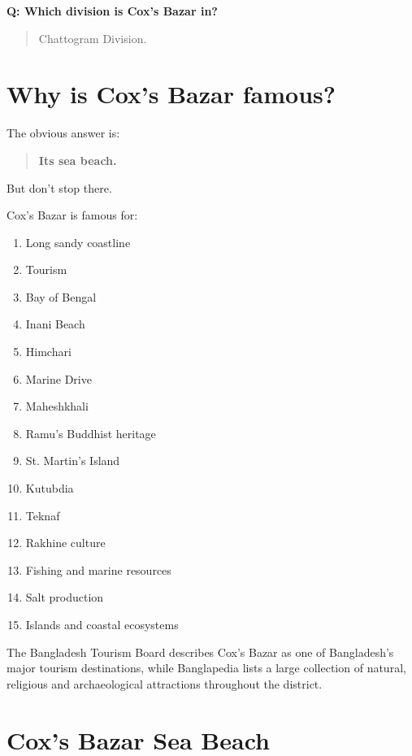 \textbf{Q: Which division is Cox's Bazar in?}

\begin{quote}
Chattogram Division.\\
\end{quote}

\medskip

\section{Why is Cox's Bazar famous?}

The obvious answer is:

\begin{quote}
\textbf{Its sea beach.}\\
\end{quote}

But don't stop there.

Cox's Bazar is famous for:

\begin{enumerate}
  \item Long sandy coastline
  \item Tourism
  \item Bay of Bengal
  \item Inani Beach
  \item Himchari
  \item Marine Drive
  \item Maheshkhali
  \item Ramu's Buddhist heritage
  \item St. Martin's Island
  \item Kutubdia
  \item Teknaf
  \item Rakhine culture
  \item Fishing and marine resources
  \item Salt production
  \item Islands and coastal ecosystems
\end{enumerate}

The Bangladesh Tourism Board describes Cox's Bazar as one of Bangladesh's major tourism destinations, while Banglapedia lists a large collection of natural, religious and archaeological attractions throughout the district.

\medskip

\section{Cox's Bazar Sea Beach}

